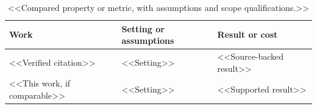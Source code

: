 \begin{table}[t]
\centering
\caption{<<Compared property or metric, with assumptions and scope qualifications.>>}
\label{tab:related}
\begin{tabular}{lll}
\toprule
Work & Setting or assumptions & Result or cost \\
\midrule
<<Verified citation>> & <<Setting>> & <<Source-backed result>> \\
<<This work, if comparable>> & <<Setting>> & <<Supported result>> \\
\bottomrule
\end{tabular}
\end{table}
